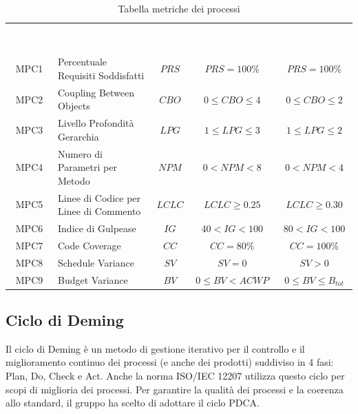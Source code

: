     \renewcommand{\arraystretch}{1.5}
    \begin{longtable}{ c C{4cm} c c c}
    \caption{Tabella metriche dei processi}\\
    \textcolor{white}{\textbf{Metrica}} & \textcolor{white}{\textbf{Nome}} & \textcolor{white}{\textbf{Sigla}} & \textcolor{white}{\textbf{Range Accettabile}} & \textcolor{white}{\textbf{Range Ottimale}}\\
    MPC1 & Percentuale Requisiti Soddisfatti & $PRS$ & $PRS = 100\%$ & $PRS = 100\%$ \\
    MPC2 & Coupling Between Objects & $CBO$ & $0 \leq CBO \leq 4$ & $0 \leq CBO \leq 2$ \\
    MPC3 & Livello Profondità Gerarchia & $LPG$ &  $1 \leq LPG \leq 3$ &  $1 \leq LPG \leq 2$ \\
    MPC4 & Numero di Parametri per Metodo & $NPM$ & $0 < NPM < 8$ & $ 0 < NPM < 4$ \\
    MPC5 & Linee di Codice per Linee di Commento & $LCLC$ & $LCLC \geq 0.25$ & $LCLC \geq 0.30$ \\
    MPC6 & Indice di Gulpease & $IG$ & $40 < IG < 100$ & $80 < IG < 100$ \\
    MPC7 & Code Coverage & $CC$ & $CC = 80\%$ & $CC = 100\%$  \\
    MPC8 & Schedule Variance & $SV$ & $SV = 0$ & $SV > 0$  \\	
    MPC9 & Budget Variance & $BV$ & $0 \leq BV < ACWP$ & $0 \leq BV \leq B_{tot}$  \\
    \end{longtable}

\subsection{Ciclo di Deming}
Il ciclo di Deming è un metodo di gestione iterativo per il controllo e il miglioramento continuo dei processi (e anche dei prodotti) suddiviso in 4 fasi: Plan, Do, Check e Act. 
Anche la norma ISO/IEC 12207 utilizza questo ciclo per scopi di miglioria dei processi. Per garantire la qualità dei processi e la coerenza allo standard, il gruppo \Gruppo  
ha scelto di adottare il ciclo PDCA.

